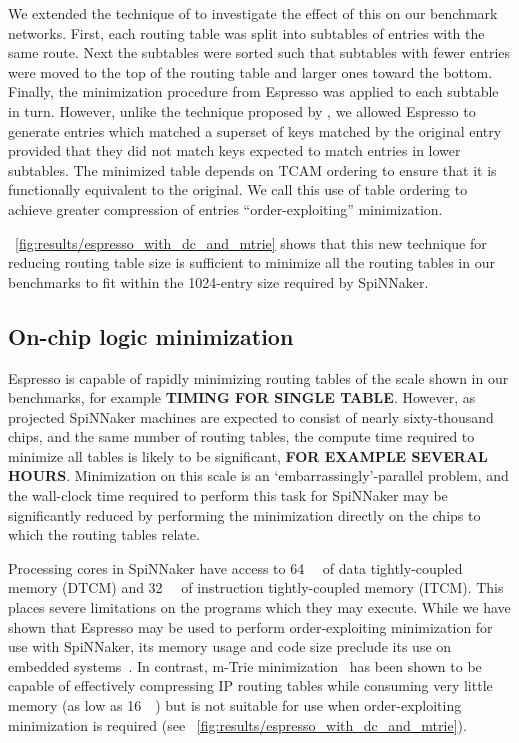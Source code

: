 \documentclass[conference]{IEEEtran}
\begin{document}
We extended the technique of \textcite{Liu2002} to investigate the effect of this on our benchmark networks.
First, each routing table was split into subtables of entries with the same route.
Next the subtables were sorted such that subtables with fewer entries were moved to the top of the routing table and larger ones toward the bottom.
Finally, the minimization procedure from Espresso was applied to each subtable in turn.
However, unlike the technique proposed by \textcite{Liu2002}, we allowed Espresso to generate entries which matched a superset of keys matched by the original entry provided that they did not match keys expected to match entries in lower subtables.
The minimized table depends on TCAM ordering to ensure that it is functionally equivalent to the original.
We call this use of table ordering to achieve greater compression of entries ``order-exploiting'' minimization.

\figurename~\ref{fig:results/espresso_with_dc_and_mtrie} shows that this new technique for reducing routing table size is sufficient to minimize all the routing tables in our benchmarks to fit within the 1024-entry size required by SpiNNaker.

\subsection*{On-chip logic minimization}

Espresso is capable of rapidly minimizing routing tables of the scale shown in our benchmarks, for example \textbf{TIMING FOR SINGLE TABLE}.
However, as projected SpiNNaker machines are expected to consist of nearly sixty-thousand chips, and the same number of routing tables, the  compute time required to minimize all tables is likely to be significant, \textbf{FOR EXAMPLE SEVERAL HOURS}.
Minimization on this scale is an `embarrassingly'-parallel problem, and the wall-clock time required to perform this task for SpiNNaker may be significantly reduced by performing the minimization directly on the chips to which the routing tables relate.

Processing cores in SpiNNaker have access to \SI{64}{\kibi\byte} of data tightly-coupled memory (DTCM) and \SI{32}{\kibi\byte} of instruction tightly-coupled memory (ITCM).
This places severe limitations on the programs which they may execute.
While we have shown that Espresso may be used to perform order-exploiting minimization for use with SpiNNaker, its memory usage and code size preclude its use on embedded systems~\parencite{Lysecky2003}.
In contrast, m-Trie minimization~\parencite{Ahmad2007} has been shown to be capable of effectively compressing IP routing tables while consuming very little memory (as low as \SI{16}{\kibi\byte}) but is not suitable for use when order-exploiting minimization is required (see \figurename~\ref{fig:results/espresso_with_dc_and_mtrie}).
\end{document}
